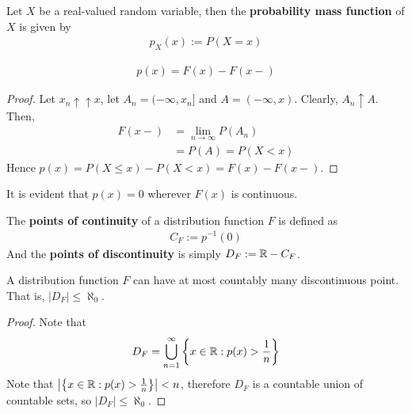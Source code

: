 \documentclass{article}
\begin{document}
   	\begin{definition}
   		Let $X$ be a real-valued random variable, then the \textbf{probability mass function} of $X$ is given by
   		\begin{align}
   			p_X(x) := P(X=x)
   		\end{align}
   	\end{definition}
   	
   	\begin{proposition}
   		\begin{align}
   			p(x) = F(x) - F(x-)
   		\end{align}
   	\end{proposition}
   	\begin{proof}
   		Let $x_n \uparrow\uparrow x$, let $A_n = (-\infty, x_n]$ and $A = (-\infty, x)$. Clearly, $A_n \uparrow A$. Then,
   		\begin{align}
   			F(x-) &= \lim_{n \to \infty} P(A_n) \\
   			&= P(A) = P(X < x)
   		\end{align}
   		Hence $p(x) = P(X \leq x) - P(X < x) = F(x) - F(x-)$.
   	\end{proof}
   	
   	\begin{proposition}
   		It is evident that $p(x) = 0$ wherever $F(x)$ is continuous.
   	\end{proposition}
   	
   	\begin{definition}
   		The \textbf{points of continuity} of a distribution function $F$ is defined as
   		\begin{align}
   			C_F := p^{-1}(0)
   		\end{align}
   		And the \textbf{points of discontinuity} is simply $D_F := \mathbb{R} - C_F$.
   	\end{definition}
   	
   	\begin{theorem}
   		A distribution function $F$ can have at most countably many discontinuous point. That is, $|D_F| \leq \aleph_0$.
   	\end{theorem}
   	
   	\begin{proof}
   		Note that
   		\begin{align}
   			D_F = \bigcup_{n=1}^\infty \left\{x\in \mathbb{R}: p(x) > \frac{1}{n}\right\}
   		\end{align}
   		Note that $\big \vert {\left\{x\in \mathbb{R}: p(x) > \frac{1}{n}\right\}} \big \vert < n$, therefore $D_F$ is a countable union of countable sets, so $|D_F| \leq \aleph_0$.
   	\end{proof}
   	
\end{document}
